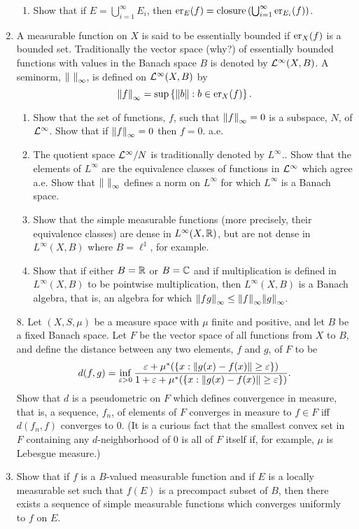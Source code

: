 \begin{enumerate}[label=\arabic*).]
\begin{enumerate}
    \item Show that if $E=\bigcup_{i=1}^\infty E_i$, then $\er{f}{E}=\text{closure}\br{\bigcup_{i=1}^\infty\er{f}{E_i}}$.
\end{enumerate}

\item A measurable function on $X$ is said to be essentially bounded if $\er{f}{X}$ is a bounded set. Traditionally the vector space (why?) of essentially bounded functions with values in the Banach space $B$ is denoted by $\cL^\infty(X, B)$. A seminorm, $\norm{~}_\infty$, is defined on $\cL^\infty(X, B)$ by $$\norm{f}_\infty=\sup\brc{\norm{b}: b\in\er{f}{X}}.$$
\begin{enumerate}
    \item Show that the set of functions, $f$, such that $\norm{f}_\infty=0$ is a subspace, $N$, of $\cL^\infty$. Show that if $\norm{f}_\infty=0$ then $f=0$. a.e.
    
    \item The quotient space $\cL^\infty/N$ is traditionally denoted by $L^\infty .$. Show that the elements of $L^\infty$ are the equivalence classes of functions in $\cL^\infty$ which agree a.e. Show that $\norm{~}_\infty$ defines a norm on $L^\infty$ for which $L^\infty$ is a Banach space.

    \item Show that the simple measurable functions (more precisely, their equivalence classes) are dense in $L^\infty(X,\bR)$, but are not dense in $L^\infty(X, B)$ where $B=\ell^1$, for example.

    \item Show that if either $B=\bR$ or $B=\bC$ and if multiplication is defined in $L^\infty(X, B)$ to be pointwise multiplication, then $L^\infty(X, B)$ is a Banach algebra, that is, an algebra for which $\norm{fg}_\infty\leq\norm{f}_\infty\norm{g}_\infty$.
\end{enumerate}

8. Let $(X, S, \mu)$ be a measure space with $\mu$ finite and positive, and let $B$ be a fixed Banach space. Let $F$ be the vector space of all functions from $X$ to $B$, and define the distance between any two elements, $f$ and $g$, of $F$ to be $$d(f,g)=\inf_{\ep>0}\frac{\ep+\mu^*(\brc{x:\norm{g(x)-f(x)}\geq\ep})}{1+\ep+\mu^*(\brc{x:\norm{g(x)-f(x)}\geq\ep})}.$$
Show that $d$ is a pseudometric on $F$ which defines convergence in measure, that is, a sequence, $f_n$, of elements of $F$ converges in measure to $f \in F$ iff $d(f_n, f)$ converges to 0. (It is a curious fact that the smallest convex set in $F$ containing any $d$-neighborhood of 0 is all of $F$ itself if, for example, $\mu$ is Lebesgue measure.)

\item Show that if $f$ is a $B$-valued measurable function and if $E$ is a locally measurable set such that $f(E)$ is a precompact subset of $B$, then there exists a sequence of simple measurable functions which converges uniformly to $f$ on $E$.
\end{enumerate}